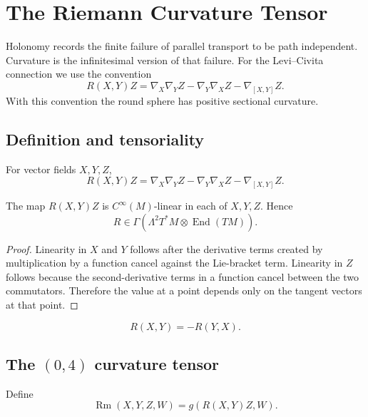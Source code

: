 \chapter{The Riemann Curvature Tensor}
\label{ch:vii26-riemann-curvature}

Holonomy records the finite failure of parallel transport to be path independent.
Curvature is the infinitesimal version of that failure.  For the Levi--Civita
connection we use the convention
\[
\boxed{
R(X,Y)Z
=
\nabla_X\nabla_YZ-\nabla_Y\nabla_XZ-\nabla_{[X,Y]}Z.
}
\]
With this convention the round sphere has positive sectional curvature.

\section{Definition and tensoriality}

\begin{definition}\label{def:vii26-curvature-operator}
For vector fields \(X,Y,Z\),
\[
R(X,Y)Z
=
\nabla_X\nabla_YZ-\nabla_Y\nabla_XZ-\nabla_{[X,Y]}Z.
\]
\end{definition}

\begin{theorem}[Tensoriality]\label{thm:vii26-tensoriality}
The map \(R(X,Y)Z\) is \(C^\infty(M)\)-linear in each of \(X,Y,Z\). Hence
\[
R\in\Gamma\!\left(\Lambda^2T^*M\otimes\operatorname{End}(TM)\right).
\]
\end{theorem}

\begin{proof}
Linearity in \(X\) and \(Y\) follows after the derivative terms created by
multiplication by a function cancel against the Lie-bracket term.  Linearity in
\(Z\) follows because the second-derivative terms in a function cancel between the
two commutators.  Therefore the value at a point depends only on the tangent
vectors at that point.
\end{proof}

\begin{proposition}\label{prop:vii26-skew12}
\[
R(X,Y)=-R(Y,X).
\]
\end{proposition}

\section{The \((0,4)\) curvature tensor}

\begin{definition}\label{def:vii26-rm4}
Define
\[
\operatorname{Rm}(X,Y,Z,W)
=
g(R(X,Y)Z,W).
\]
\end{definition}

